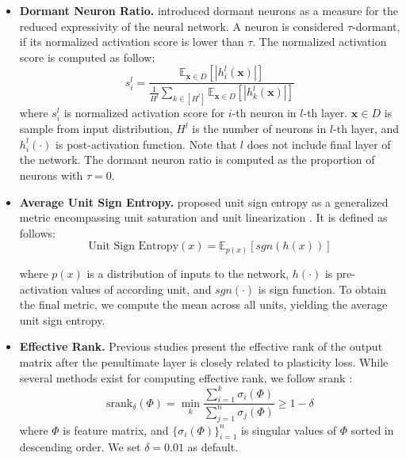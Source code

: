 \begin{itemize}
    \item \textbf{Dormant Neuron Ratio.} \citet{sokar2023dormant} introduced dormant neurons as a measure for the reduced expressivity of the neural network. A neuron is considered $\tau$-dormant, if its normalized activation score is lower than $\tau$. The normalized activation score is computed as follow:
    \[s_i^l = \frac{\mathbb E_{\mathbf{x}\in D}\left[|h_i^l(\mathbf{x})|\right]}{\frac{1}{H^l}\sum_{k\in [H^l]}\mathbb E_{\mathbf{x}\in D}\left[|h_k^l(\mathbf{x})|\right]}\]
    where $s_i^l$ is normalized activation score for $i$-th neuron in $l$-th layer. $\mathbf{x}\in D$ is sample from input distribution, $H^l$ is the number of neurons in $l$-th layer, and $h_i^l(\cdot)$ is post-activation function. Note that $l$ does not include final layer of the network. The dormant neuron ratio is computed as the proportion of neurons with $\tau=0$.
    \item \textbf{Average Unit Sign Entropy.} \citet{lewandowski2024plastic} proposed unit sign entropy as a generalized metric encompassing unit saturation \citep{abbas2023loss} and unit linearization \citep{lyle2024disentangling}. It is defined as follows:
    \[\text{Unit Sign Entropy}(x) = \mathbb E_{p(x)} [sgn(h(x))]\]

    where $p(x)$ is a distribution of inputs to the network, $h(\cdot)$ is pre-activation values of according unit, and $sgn(\cdot)$ is sign function. To obtain the final metric, we compute the mean across all units, yielding the average unit sign entropy.
    \item \textbf{Effective Rank.} Previous studies \cite{kumar2020implicit, lyle2022understanding} present the effective rank of the output matrix after the penultimate layer is closely related to plasticity loss. While several methods exist for computing effective rank, we follow srank \cite{kumar2020implicit}:
\[\text{srank}_\delta(\Phi) = \min_k\frac{\sum_{i=1}^k\sigma_i(\Phi)}{\sum_{j=1}^n\sigma_j(\Phi)}\geq1-\delta\]
where $\Phi$ is feature matrix, and $\{\sigma_i(\Phi)\}_{i=1}^n$ is singular values of $\Phi$ sorted in descending order. We set $\delta=0.01$ as default.

\end{itemize}

